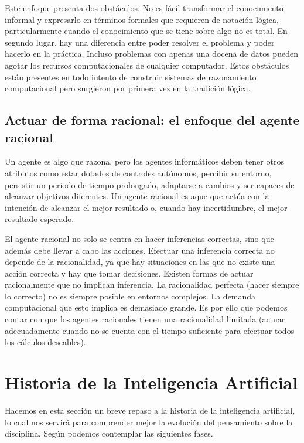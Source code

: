 \documentclass[12pt,a4paper]{article}
\begin{document}
Este enfoque presenta dos obstáculos. No es fácil transformar el conocimiento informal y expresarlo en términos formales que requieren de notación lógica, particularmente cuando el conocimiento que se tiene sobre algo no es total. En segundo lugar, hay una diferencia entre poder resolver el problema y poder hacerlo en la práctica. Incluso problemas con apenas una docena de datos pueden agotar los recursos computacionales de cualquier computador. Estos obstáculos están presentes en todo intento de construir sistemas de razonamiento computacional pero surgieron por primera vez en la tradición lógica.

\subsection{Actuar de forma racional: el enfoque del agente racional}
Un agente es algo que razona, pero los agentes informáticos deben tener otros atributos como estar dotados de controles autónomos, percibir su entorno, persistir un periodo de tiempo prolongado, adaptarse a cambios y ser capaces de alcanzar objetivos diferentes. Un agente racional es aque que actúa con la intención de alcanzar el mejor resultado o, cuando hay incertidumbre, el mejor resultado esperado.

El agente racional no solo se centra en hacer inferencias correctas, sino que además debe llevar a cabo las acciones. Efectuar una inferencia correcta no depende de la racionalidad, ya que hay situaciones en las que no existe una acción correcta y hay que tomar decisiones. Existen formas de actuar racionalmente que no implican inferencia. La racionalidad perfecta (hacer siempre lo correcto) no es siempre posible en entornos complejos. La demanda computacional que esto implica es demasiado grande. Es por ello que podemos contar con que los agentes racionales tienen una racionalidad limitada (actuar adecuadamente cuando no se cuenta con el tiempo suficiente para efectuar todos los cálculos deseables).

\section{Historia de la Inteligencia Artificial}

Hacemos en esta sección un breve repaso a la historia de la inteligencia artificial, lo cual nos servirá para comprender mejor la evolución del pensamiento sobre la disciplina. Según \cite{RussellNorvig} podemos contemplar las siguientes fases.
\end{document}
